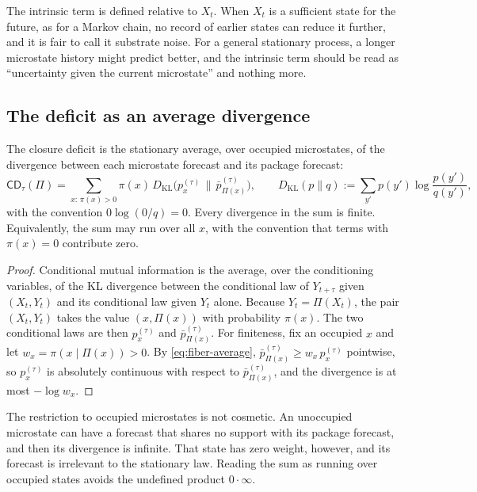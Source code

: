 \begin{remark}\label{rem:intrinsic}
The intrinsic term is defined relative to $X_t$. When $X_t$ is a sufficient state for the future, as for a Markov chain, no record of earlier states can reduce it further, and it is fair to call it substrate noise. For a general stationary process, a longer microstate history might predict better, and the intrinsic term should be read as ``uncertainty given the current microstate'' and nothing more.
\end{remark}

\subsection{The deficit as an average divergence}

\begin{proposition}\label{prop:cd-kl}
The closure deficit is the stationary average, over occupied microstates, of the divergence between each microstate forecast and its package forecast:
\begin{equation}
\mathsf{CD}_\tau(\Pi)
=
\sum_{x:\,\pi(x)>0}
\pi(x)\,
D_{\mathrm{KL}}\!\bigl(
p_x^{(\tau)}
\,\big\|\,
\bar p_{\Pi(x)}^{(\tau)}
\bigr),
\qquad
D_{\mathrm{KL}}(p\|q) := \sum_{y'} p(y') \log \frac{p(y')}{q(y')},
\label{eq:cd-kl}
\end{equation}
with the convention $0\log(0/q)=0$. Every divergence in the sum is finite. Equivalently, the sum may run over all $x$, with the convention that terms with $\pi(x)=0$ contribute zero.
\end{proposition}

\begin{proof}
Conditional mutual information is the average, over the conditioning variables, of the KL divergence between the conditional law of $Y_{t+\tau}$ given $(X_t,Y_t)$ and its conditional law given $Y_t$ alone. Because $Y_t=\Pi(X_t)$, the pair $(X_t,Y_t)$ takes the value $(x,\Pi(x))$ with probability $\pi(x)$. The two conditional laws are then $p_x^{(\tau)}$ and $\bar p_{\Pi(x)}^{(\tau)}$. For finiteness, fix an occupied $x$ and let $w_x=\pi(x\mid\Pi(x))>0$. By \eqref{eq:fiber-average}, $\bar p_{\Pi(x)}^{(\tau)}\ge w_x\,p_x^{(\tau)}$ pointwise, so $p_x^{(\tau)}$ is absolutely continuous with respect to $\bar p_{\Pi(x)}^{(\tau)}$, and the divergence is at most $-\log w_x$.
\end{proof}

The restriction to occupied microstates is not cosmetic. An unoccupied microstate can have a forecast that shares no support with its package forecast, and then its divergence is infinite. That state has zero weight, however, and its forecast is irrelevant to the stationary law. Reading the sum as running over occupied states avoids the undefined product $0\cdot\infty$.

